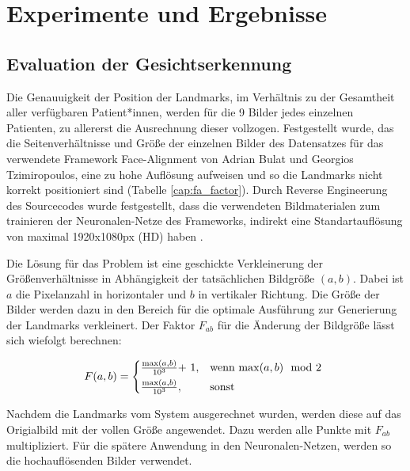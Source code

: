 \chapter{Experimente und Ergebnisse}\label{experiment}

\section{Evaluation der Gesichtserkennung}\label{evalfa}
Die Genauuigkeit der Position der Landmarks, im Verhältnis zu der Gesamtheit aller verfügbaren Patient*innen, werden für die 9 Bilder jedes einzelnen Patienten, zu allererst die Ausrechnung dieser vollzogen. Festgestellt wurde, das die Seitenverhältnisse und Größe der einzelnen Bilder des Datensatzes für das verwendete Framework \glqq Face-Alignment\grqq{} von Adrian Bulat und Georgios Tzimiropoulos, eine zu hohe Auflösung aufweisen und so die Landmarks nicht korrekt positioniert sind (Tabelle \ref{cap:fa_factor}). Durch Reverse Engineerung des Sourcecodes wurde festgestellt, dass die verwendeten Bildmaterialen zum trainieren der Neuronalen-Netze des Frameworks, indirekt eine Standartauflösung von maximal 1920x1080px (HD) haben \cite{fa_framework}.


Die Lösung für das Problem ist eine geschickte Verkleinerung der Größenverhältnisse in Abhängigkeit der tatsächlichen Bildgröße $(a, b)$. Dabei ist $a$ die Pixelanzahl in horizontaler und $b$ in vertikaler Richtung. Die Größe der Bilder werden dazu in den Bereich für die optimale Ausführung zur Generierung der Landmarks verkleinert. Der Faktor $F_{ab}$ für die Änderung der Bildgröße lässt sich wiefolgt berechnen:

\begin{equation}
F(a, b) = \begin{cases*}
  \frac{\max(a, b)}{10^{3}} $+ 1$,  & wenn $\max(a, b) \mod 2$  \\
  \frac{\max(a, b)}{10^{3}},        & sonst
\end{cases*}
\end{equation}

Nachdem die Landmarks vom System ausgerechnet wurden, werden diese auf das Origialbild mit der vollen Größe angewendet. Dazu werden alle Punkte mit $F_{ab}$ multipliziert. Für die spätere Anwendung in den Neuronalen-Netzen, werden so die hochauflösenden Bilder verwendet.




